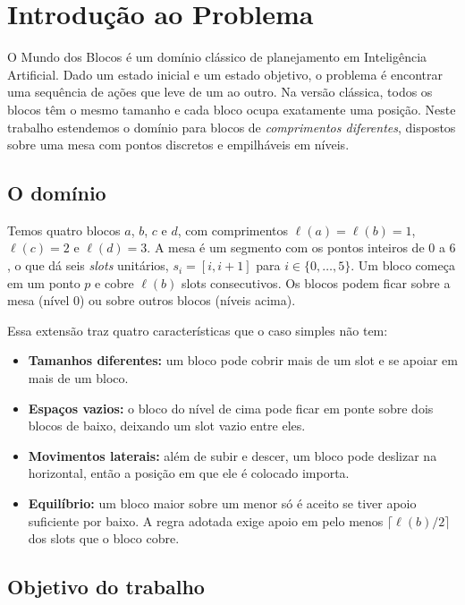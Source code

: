 \section{Introdu\c{c}\~ao ao Problema}

O Mundo dos Blocos \'e um dom\'inio cl\'assico de planejamento em Intelig\^encia Artificial.
Dado um estado inicial e um estado objetivo, o problema \'e encontrar uma sequ\^encia de a\c{c}\~oes que leve de um ao outro.
Na vers\~ao cl\'assica, todos os blocos t\^em o mesmo tamanho e cada bloco ocupa exatamente uma posi\c{c}\~ao.
Neste trabalho estendemos o dom\'inio para blocos de \emph{comprimentos diferentes}, dispostos sobre uma mesa com pontos discretos e empilh\'aveis em n\'iveis.

\subsection{O dom\'inio}

Temos quatro blocos $a$, $b$, $c$ e $d$, com comprimentos $\ell(a)=\ell(b)=1$, $\ell(c)=2$ e $\ell(d)=3$.
A mesa \'e um segmento com os pontos inteiros de $0$ a $6$, o que d\'a seis \emph{slots} unit\'arios, $s_i=[i,i+1]$ para $i\in\{0,\dots,5\}$.
Um bloco come\c{c}a em um ponto $p$ e cobre $\ell(b)$ slots consecutivos. Os blocos podem ficar sobre a mesa (n\'ivel $0$) ou sobre outros blocos (n\'iveis acima).

Essa extens\~ao traz quatro caracter\'isticas que o caso simples n\~ao tem:
\begin{itemize}
\item \textbf{Tamanhos diferentes:} um bloco pode cobrir mais de um slot e se apoiar em mais de um bloco.
\item \textbf{Espa\c{c}os vazios:} o bloco do n\'ivel de cima pode ficar em ponte sobre dois blocos de baixo, deixando um slot vazio entre eles.
\item \textbf{Movimentos laterais:} al\'em de subir e descer, um bloco pode deslizar na horizontal, ent\~ao a posi\c{c}\~ao em que ele \'e colocado importa.
\item \textbf{Equil\'ibrio:} um bloco maior sobre um menor s\'o \'e aceito se tiver apoio suficiente por baixo. A regra adotada exige apoio em pelo menos $\lceil \ell(b)/2\rceil$ dos slots que o bloco cobre.
\end{itemize}

\subsection{Objetivo do trabalho}

